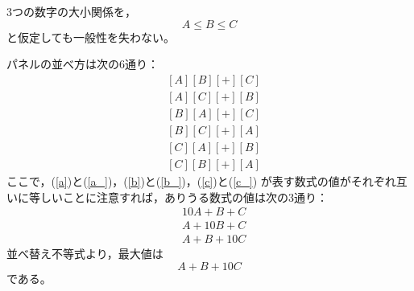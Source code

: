 \documentclass{article}
\begin{document}
3つの数字の大小関係を，
$$A \leq B \leq C$$
と仮定しても一般性を失わない。

パネルの並べ方は次の$6$通り：
\begin{eqnarray}
    &[A][B][+][C] \label{a} \\
    &[A][C][+][B] \label{a_} \\
    &[B][A][+][C] \label{b} \\
    &[B][C][+][A] \label{b_} \\
    &[C][A][+][B] \label{c} \\
    &[C][B][+][A] \label{c_}
\end{eqnarray}
ここで，(\ref{a})と(\ref{a_})，(\ref{b})と(\ref{b_})，(\ref{c})と(\ref{c_})
が表す数式の値がそれぞれ互いに等しいことに注意すれば，ありうる数式の値は次の$3$通り：
\begin{eqnarray}
    &10A + B + C \\
    &A + 10B + C \\
    &A + B + 10C
\end{eqnarray}
並べ替え不等式より，最大値は$$A + B + 10C$$である。
\end{document}
